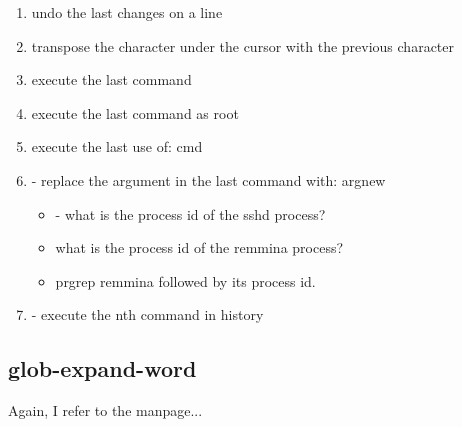 \begin{enumerate}
    \item{  undo the last changes on a line}
    \item{  transpose the character under the cursor with the previous character}
    \item{\tbi{!!}  execute the last command}
    \item{  execute the last command as root}
    \item{  execute the last use of: cmd}
    \item{ - replace the argument in the last command with: argnew}
		    \begin{itemize}
		    	\item {} - what is the process id of the sshd process?
		    	\item {}  what is the process id of the remmina process?
		    	\item {} prgrep remmina followed by its process id.
		    \end{itemize}
    \item{ - execute the nth command in history}    
\end{enumerate}

\subsection{glob-expand-word}

Again, I refer to the manpage...

